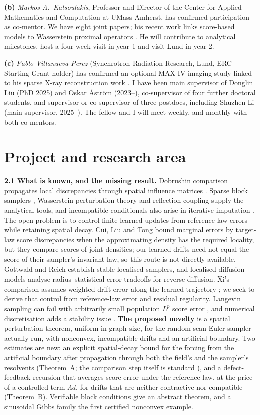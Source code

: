 \documentclass[12pt,a4paper]{article}
\begin{document}
\textbf{(b)} \textit{Markos A.\ Katsoulakis}, Professor and Director of the Center for Applied Mathematics and Computation at UMass Amherst, has confirmed participation as co-mentor. We have eight joint papers; his recent work links score-based models to Wasserstein proximal operators \cite{ZLLKO24}. He will contribute to analytical milestones, host a four-week visit in year 1 and visit Lund in year 2.

\textbf{(c)} \textit{Pablo Villanueva-Perez} (Synchrotron Radiation Research, Lund, ERC Starting Grant holder) has confirmed an optional MAX IV imaging study linked to his sparse X-ray reconstruction work \cite{Zhang25}.
I have been main supervisor of Donglin Liu (PhD 2025) and Oskar \AA{}str\"om (2023--), co-supervisor of four further doctoral students, and supervisor or co-supervisor of three postdocs, including Shuzhen Li (main supervisor, 2025--). The fellow and I will meet weekly, and monthly with both co-mentors.

\section{Project and research area}
\textbf{2.1 What is known, and the missing result.} Dobrushin comparison propagates local discrepancies through spatial influence matrices \cite{Dob70,RvH14}. Sparse block samplers \cite{TMM20}, Wasserstein perturbation theory \cite{RS18} and reflection coupling \cite{Eberle16,MMS20} supply the analytical tools, and incompatible conditionals also arise in iterative imputation \cite{LGHSK14}. The open problem is to control finite learned updates from reference-law errors while retaining spatial decay. Cui, Liu and Tong \cite{CLT} bound marginal errors by target-law score discrepancies when the approximating density has the required locality, but they compare scores of joint densities; our learned drifts need not equal the score of their sampler's invariant law, so this route is not directly available. Gottwald and Reich \cite{GR26} establish stable localised samplers, and localised diffusion models \cite{GLMRT} analyse radius--statistical-error tradeoffs for reverse diffusion. Xi's comparison assumes weighted drift error along the learned trajectory \cite{Xi26}; we seek to derive that control from reference-law error and residual regularity. Langevin sampling can fail with arbitrarily small population $L^p$ score error \cite{CCSW26}, and numerical discretisation adds a stability issue \cite{Zho26}.
\textbf{The proposed novelty} is a spatial perturbation theorem, uniform in graph size, for the random-scan Euler sampler actually run, with nonconvex, incompatible drifts and an artificial boundary. Two estimates are new: an explicit spatial-decay bound for the forcing from the artificial boundary after propagation through both the field's and the sampler's resolvents (Theorem~A; the comparison step itself is standard \cite{RvH14}), and a defect-feedback recursion that averages score error under the reference law, at the price of a controlled term $\Lambda d$, for drifts that are neither contractive nor compatible (Theorem~B). Verifiable block conditions give an abstract theorem, and a sinusoidal Gibbs family the first certified nonconvex example.
\end{document}
